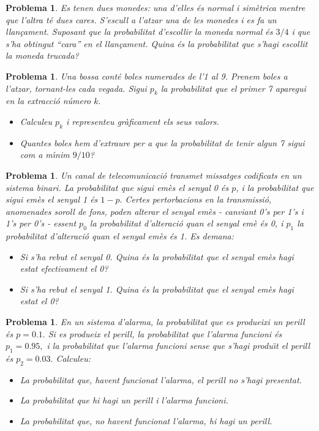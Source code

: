 \documentclass[11pt]{article}
\newcounter{prbcont}
\newtheorem{problema}[prbcont]{Problema}
\begin{document}
\begin{problema}
Es tenen dues monedes: una d'elles \'es normal i sim\`etrica mentre que l'altra t\'e dues cares. S'escull a l'atzar una de les monedes i es fa un llan\c{c}ament. Suposant que la probabilitat d'escollir la moneda normal \'es $3/4$ i que s'ha obtingut ``cara'' en el llan\c{c}ament. Quina \'es la probabilitat que s'hagi escollit la moneda trucada? %
\end{problema}

\begin{problema}
Una bossa cont\'e boles numerades de l'1 al 9. Prenem boles a l'atzar, tornant-les cada vegada. Sigui $p_k$ la probabilitat que el primer 7 aparegui en la extracci\'o n\'umero $k.$
\begin{itemize}
\item [(a)] Calculeu $p_k$ i representeu gr\`aficament els seus valors.
\item [(b)] Quantes boles hem d'extraure per a que la probabilitat de tenir algun 7 sigui com a m\'{\i}nim $9/10$?
\end{itemize}
\end{problema}

\begin{problema}
Un canal de telecomunicaci\'o transmet missatges codificats en un sistema binari. La probabilitat que sigui em\`es el senyal 0 \'es $p$, i la probabilitat que sigui em\`es el senyal 1 \'es $1-p.$ Certes pertorbacions en la transmissi\'o, anomenades soroll de fons, poden alterar el senyal em\`es - canviant 0's per 1's i 1's per 0's - essent $p_0$ la probabilitat d'alteraci\'o quan el senyal em\`e \'es 0, i $p_1$ la probabilitat d'alteraci\'o quan el senyal em\`es
\'es 1. Es demana:
\begin{itemize}
\item [(a)] Si s'ha rebut el senyal 0. Quina \'es la probabilitat que el senyal em\`es hagi estat
efectivament el 0? %
\item [(b)] Si s'ha rebut el senyal 1. Quina \'es la probabilitat que el senyal em\`es hagi estat
el 0? %
\end{itemize}
\end{problema}

\begin{problema}
En un sistema d'alarma, la probabilitat que es produeixi un perill \'es $p=0.1.$ Si es produeix el perill, la probabilitat que l'alarma funcioni \'es $p_1 = 0.95,$ i la probabilitat que l'alarma funcioni sense que s'hagi produ\"{\i}t el perill \'es $p_2 = 0.03.$ Calculeu:
\begin{itemize}
\item [(a)] La probabilitat que, havent funcionat l'alarma, el perill no s'hagi presentat. %
\item [(b)] La probabilitat que hi hagi un perill i l'alarma funcioni. %
\item [(c)] La probabilitat que, no havent funcionat l'alarma, hi hagi un perill. %
\end{itemize}
\end{problema}
\end{document}
